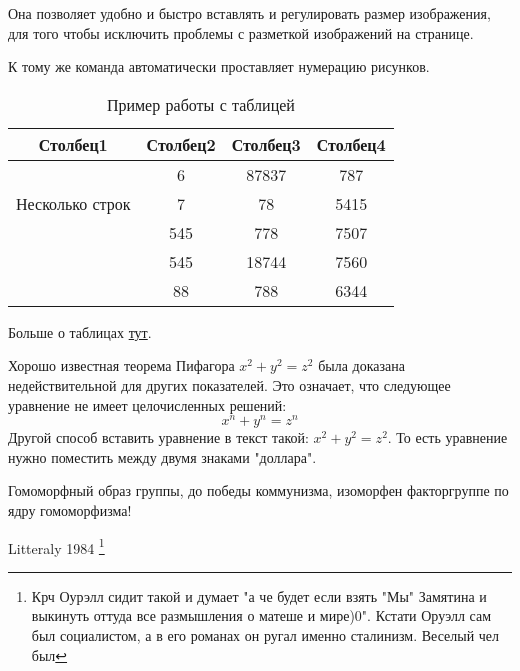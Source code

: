 
Она позволяет удобно и быстро вставлять и регулировать размер изображения, для того чтобы исключить проблемы с разметкой изображений на странице.



К тому же команда автоматически проставляет нумерацию рисунков.

\begin{table}[h!]
	\caption{Пример работы с таблицей}
	\label{table:1}
	\centering
	\begin{tabular}{|c|c|c|c|}
	 \hline
	 Столбец1 & Столбец2 & Столбец3 & Столбец4 \\ [0.5ex]
	 \hline
	 \multirow{3}{5em}{Несколько строк} & 6 & 87837 & 787 \\
	  &  7 & 78 & 5415 \\
	   & 545 & 778 & 7507 \\
	   & 545 & 18744 & 7560 \\
	   & 88 & 788 & 6344 \\ [1ex]
	 \hline
	\end{tabular}
\end{table}


Больше о таблицах \href{https://www.overleaf.com/learn/latex/Tables}{тут}.


    Хорошо известная теорема Пифагора \(x^2 + y^2 = z^2\) была
    доказана недействительной для других показателей.
    Это означает, что следующее уравнение не имеет целочисленных решений:
    \[ x^n + y^n = z^n \]
    Другой способ вставить уравнение в текст такой: $x^2 + y^2 = z^2$. То есть уравнение нужно поместить между двумя знаками "доллара".


		Гомоморфный образ группы, до победы коммунизма, изоморфен факторгруппе по ядру гомоморфизма!


		Litteraly 1984
		\footnote{
		Крч Оурэлл сидит такой и думает "а че будет если взять "Мы" Замятина и выкинуть
		оттуда все размышления о матеше и мире)0". Кстати Оруэлл сам был социалистом, а в его романах он ругал именно сталинизм. Веселый чел был
		}

